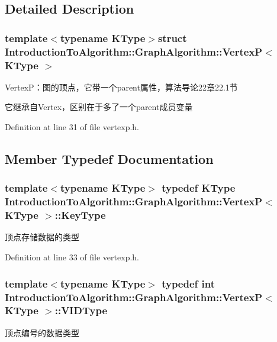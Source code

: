 \subsection{Detailed Description}
\subsubsection*{template$<$typename K\+Type$>$struct Introduction\+To\+Algorithm\+::\+Graph\+Algorithm\+::\+Vertex\+P$<$ K\+Type $>$}

Vertex\+P：图的顶点，它带一个parent属性，算法导论22章22.1节 

它继承自\+Vertex，区别在于多了一个parent成员变量 

Definition at line 31 of file vertexp.\+h.



\subsection{Member Typedef Documentation}
\hypertarget{struct_introduction_to_algorithm_1_1_graph_algorithm_1_1_vertex_p_aa48c040b6a076ae4e1cbd5cd51f42241}{}
\subsubsection[{Key\+Type}]{\setlength{\rightskip}{0pt plus 5cm}template$<$typename K\+Type$>$ typedef K\+Type {\bf Introduction\+To\+Algorithm\+::\+Graph\+Algorithm\+::\+Vertex\+P}$<$ K\+Type $>$\+::{\bf Key\+Type}}\label{struct_introduction_to_algorithm_1_1_graph_algorithm_1_1_vertex_p_aa48c040b6a076ae4e1cbd5cd51f42241}
顶点存储数据的类型 

Definition at line 33 of file vertexp.\+h.

\hypertarget{struct_introduction_to_algorithm_1_1_graph_algorithm_1_1_vertex_p_aa15e0b509772ea84c9b5a211079d641b}{}
\subsubsection[{V\+I\+D\+Type}]{\setlength{\rightskip}{0pt plus 5cm}template$<$typename K\+Type$>$ typedef int {\bf Introduction\+To\+Algorithm\+::\+Graph\+Algorithm\+::\+Vertex\+P}$<$ K\+Type $>$\+::{\bf V\+I\+D\+Type}}\label{struct_introduction_to_algorithm_1_1_graph_algorithm_1_1_vertex_p_aa15e0b509772ea84c9b5a211079d641b}
顶点编号的数据类型 

